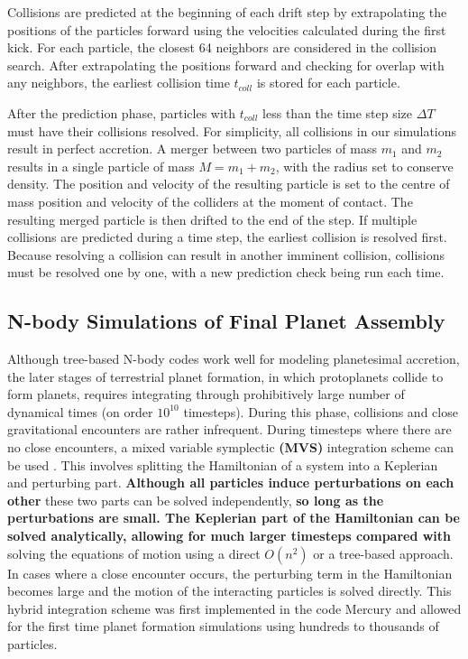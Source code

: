 Collisions are predicted at the beginning of each drift step by extrapolating the positions of the particles forward using the velocities calculated during the first kick. For each particle, the closest 64 neighbors are considered in the collision search. After extrapolating the positions forward and checking for overlap with any neighbors, the earliest collision time $t_{coll}$ is stored for each particle.

After the prediction phase, particles with $t_{coll}$ less than the time step size $\Delta T$ must have their collisions resolved. For simplicity, all collisions in our simulations result in perfect accretion. A merger between two particles of mass $m_{1}$ and $m_{2}$ results in a single particle of mass $M = m_{1} + m_{2}$, with the radius set to conserve density. The position and velocity of the resulting particle is set to the centre of mass position and velocity of the colliders at the moment of contact. The resulting merged particle is then drifted to the end of the step. If multiple collisions are predicted during a time step, the earliest collision is resolved first. Because resolving a collision can result in another imminent collision, collisions must be resolved one by one, with a new prediction check being run each time.

\subsection{N-body Simulations of Final Planet Assembly}

Although tree-based N-body codes work well for modeling planetesimal accretion, the later stages of terrestrial planet formation, in which protoplanets collide to form planets, requires integrating through prohibitively large number of dynamical times (on order $10^{10}$ timesteps). During this phase, collisions and close gravitational encounters are rather infrequent. During timesteps where there are no close encounters, a mixed variable symplectic \textbf{(MVS)} integration scheme can be used \cite{wisdom91}. This involves splitting the Hamiltonian of a system into a Keplerian and perturbing part. \textbf{Although all particles induce perturbations on each other} these two parts can be solved independently, \textbf{so long as the perturbations are small. The Keplerian part of the Hamiltonian can be solved analytically, allowing for much larger timesteps compared with} solving the equations of motion using a direct $O(n^{2})$ or a tree-based approach. In cases where a close encounter occurs, the perturbing term in the Hamiltonian becomes large and the motion of the interacting particles is solved directly. This hybrid integration scheme was first implemented in the code {\sc Mercury} \cite{chambers99} and allowed for the first time planet formation simulations using hundreds to thousands of particles.

